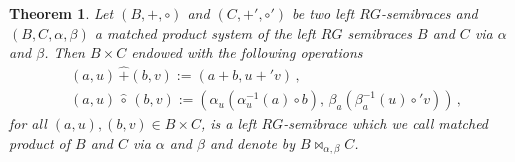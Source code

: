 \documentclass[11pt]{amsart}
\newcommand{\Aut}{\operatorname{Aut}}
\newtheorem{theorem}{Theorem}[section]
\theoremstyle{definition}
\begin{document}
\begin{theorem}
      Let $(B, +, \circ)$ and $(C, +', \circ')$ be two left $RG$-semibraces and $(B, C, \alpha, \beta)$ a matched product system of the left $RG$ semibraces $B$ and $C$ via $\alpha$ and $\beta$. 
      Then $B\times C$ endowed with the following operations
\begin{align*}
&(a, u) \, \hat{+} (b, v) := (a+b, u+'v)\,,\\
&(a,u) \, \hat{\circ}\, (b,v) :=
\left(\alpha_{u}{\left(\alpha^{-1}_{u}{\left(a\right)}\circ b\right)},\,\beta_{a}\left(\beta^{-1}_{a}\left(u\right)\circ' v \right)\right)\,,
\end{align*}
for all $(a,u), (b,v)\in B\times C$, is a left $RG$-semibrace which we call \emph{matched product of $B$ and $C$ via $\alpha$ and $\beta$} and denote by $B \bowtie_{\alpha,\beta} C$.
\end{theorem}
\end{document}
